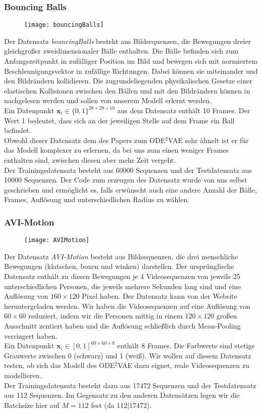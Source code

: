 \documentclass[12pt]{article}
\newcommand{\x}{\mathbf{x}_i}
\begin{document}
	\subsubsection{Bouncing Balls}
	\begin{figure}[!htbp]
		\centering
		\texttt{[image: bouncingBalls]}
	\end{figure}
	Der Datensatz \emph{bouncingBalls} besteht aus Bildsequenzen, die Bewegungen dreier gleichgroßer zweidimensionaler Bälle enthalten. Die Bälle befinden sich zum Anfangszeitpunkt in zufälliger Position im Bild und bewegen sich mit normiertem Beschleunigungsvektor in zufällige Richtungen. Dabei können sie miteinander und den Bildrändern kollidieren.
	Die zugrundeliegenden physikalischen Gesetze einer elastischen Kollisionen zwischen den Bällen und mit den Bildrändern können in \cite{ElastKol} nachgelesen werden und sollen von unserem Modell erlernt werden. \\
	Ein Datenpunkt $\x\in \{0,1\}^{28\times 28\times 10}$ aus dem Datensatz enthält 10 Frames. Der Wert 1 bedeutet, dass sich an der jeweiligen
	Stelle auf dem Frame ein Ball befindet.\\
	Obwohl dieser Datensatz dem des Papers zum ODE$^2$VAE sehr ähnelt ist er für das Modell komplexer zu erlernen, da bei uns zum einen weniger Frames enthalten sind, zwischen diesen aber mehr Zeit vergeht.\\
	Der Trainingsdatensatz besteht aus 60000 Sequenzen und der Testdatensatz aus 10000 Sequenzen.
	Der Code zum erzeugen des Datensatz wurde von uns selbst geschrieben und ermöglicht es, falls erwünscht auch eine andere Anzahl der Bälle, Frames, Auflösung und unterschiedlichen Radius zu wählen.

	\subsubsection{AVI-Motion}
	\begin{figure}[!htbp]
		\centering
		\texttt{[image: AVIMotion]}
	\end{figure}
	Der Datensatz \emph{AVI-Motion} besteht aus Bildsequenzen, die drei menschliche Bewegungen (klatschen, boxen und winken) darstellen. Der ursprünglische Datensatz enthält zu diesen Bewegungen je 4 Videosequenzen von jeweils 25 unterschiedlichen Personen, die jeweils mehrere Sekunden lang sind und eine Auflösung von $160\times120$ Pixel haben. Der Datensatz kann von der Website \cite{Dataset} heruntergeladen werden.
	Wir haben die Videosequenzen auf eine Auflösung von $60\times60$ reduziert, indem wir die Personen mittig in einem $120\times120$ großen Ausschnitt zentiert haben und die Auflösung schließlich durch Mean-Pooling verringert haben. \\
	Ein Datenpunkt $\x\in [0,1]^{60\times 60\times 8}$ enthält 8 Frames. Die Farbwerte sind stetige Grauwerte zwischen 0 (schwarz) und 1 (weiß). Wir wollen auf diesem Datensatz testen, ob sich das Modell des ODE$^2$VAE dazu eignet, reale Videosequenzen zu modellieren.\\
	Der Trainingsdatensatz besteht dazu aus 17472 Sequenzen und der Testdatensatz aus 112 Sequenzen. Im Gegensatz zu den anderen Datensätzen legen wir die Batchsize hier auf $M=112$ fest (da $112 | 17472$).
\end{document}
